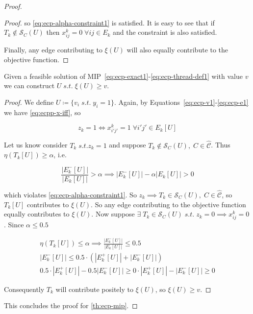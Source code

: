 \begin{proof}
\begin{proof}
		so \autoref{eq:ecp-alpha-constraint1} is satisfied. It is easy to see that
		if $T_k \not\in \mathcal{S}_C(U)$ then $x_{ij}^{k} = 0 \; \forall ij \in E_{k}$ and
		the constraint is also satisfied.

		Finally, any edge contributing to $\xi(U)$ will also
		equally contribute to the objective function.
	\end{proof}

	\begin{claim}
		\label{th:claim-xi-b-v}
		Given a feasible solution of
		MIP~\ref{eq:ecp-exact1}-\ref{eq:ecp-thread-def1} with value $v$ we can
		construct $U \; s.t. \; \xi(U) \geq v$.
	\end{claim}

	\begin{proof}
		We define $U \coloneqq \{ v_{i} \; s.t. \; y_i = 1\}$. Again, by
		Equations~\ref{eq:ecp-v1}-\ref{eq:ecp-e1} we have
		\autoref{eq:ecpp-x-iff}, so

		\begin{equation}
			\label{eq:ecpp-z-iff-xij}
			z_k = 1 \iff x_{i'j'}^{k} = 1 \; \forall i'j'
			\in E_k[U]
		\end{equation}

		Let us know consider $T_k \; s.t. z_k = 1$ and suppose $T_k \not\in
			\mathcal{S}_C(U), \; C \in \mathcal{\hat{C}}$. Thus $\eta(T_k[U]) \geq \alpha$,
		i.e.

		\begin{equation}
			\frac{|E^{-}_{k}[U]|}{|E_{k}[U]|} > \alpha \implies |E^{-}_{k}[U]| -
			\alpha |E_{k}[U]| > 0
		\end{equation}

		which violates \autoref{eq:ecp-alpha-constraint1}. So $z_k \implies T_k
			\in \mathcal{S}_C(U), \; C \in \mathcal{\hat{C}}$, so $T_k[U]$ contributes to
		$\xi(U)$. So any edge contributing to the objective function equally
		contributes to $\xi(U)$. Now suppose $\exists \; T_k \in \mathcal{S}_C(U) \; s.t.
			\; z_k = 0 \implies x_{ij}^{k} = 0$. Since $\alpha \leq 0.5$

		\begin{gather*}
			\eta(T_k[U]) \leq \alpha \implies \frac{|E^{-}_{k}[U]|}{|E_{k}[U]|}
			\leq 0.5 \\
			|E^{-}_{k}[U]| \leq 0.5 \cdot (|E^{+}_{k}[U]| + |E^{-}_{k}[U]|) \\
			0.5 \cdot |E^{+}_{k}[U]| - 0.5 |E^{-}_{k}[U]| \geq 0
			\cdot |E^{+}_{k}[U]| - |E^{-}_{k}[U]| \geq 0
		\end{gather*}

		Consequently $T_k$ will contribute positely to $\xi(U)$, so $\xi(U)
			\geq v$.
	\end{proof}

	This concludes the proof for \autoref{th:ecp-mip}.
\end{proof}

